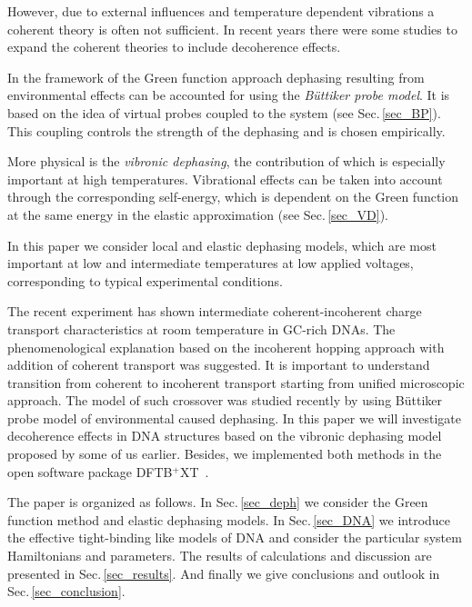 \documentclass[reprint,superscriptaddress,nofootinbib,amsmath,amssymb,prb,floatfix]{revtex4-1}
\begin{document}
However, due to external influences and temperature dependent vibrations a coherent theory is often
not sufficient. In recent years there were some studies to expand the coherent theories to include
decoherence effects.

In the framework of the Green function approach dephasing resulting from environmental effects can
be accounted for using the \textit{B\"uttiker probe model}\cite{buttiker_role_1986,
  Buttiker1988, damato_conductance_1990, Nozaki08jpcc, Nozaki12prb, Chen14jpcl, Venkatramani14faraddis, Beratan15accchemres, Kilgour15jcp}. It is based on the idea of virtual probes coupled to the
system (see Sec.\,\ref{sec_BP}). This coupling controls the strength of the dephasing and is chosen
empirically.

More physical is the \textit{vibronic dephasing}, the contribution of which is especially important
at high temperatures. Vibrational effects can be taken into account through the corresponding
self-energy, which is dependent on the Green function at the same energy in the elastic
approximation\cite{bihary_dephasing_2005, cresti_electronic_2006,
  golizadeh-mojarad_nonequilibrium_2007, penazzi_self_2016} (see Sec.\,\ref{sec_VD}).

In this paper we consider local and elastic dephasing models, which are most important at low and
intermediate temperatures at low applied voltages, corresponding to typical experimental conditions.

The recent experiment\cite{xiang_intermediate_2015} has shown intermediate coherent-incoherent
charge transport characteristics at room temperature in GC-rich DNAs. The phenomenological
explanation based on the incoherent hopping approach with addition of coherent transport was
suggested\cite{xiang_intermediate_2015}. It is important to understand transition from coherent to
incoherent transport starting from unified microscopic approach. The model of such crossover was
studied recently\cite{kim_intermediate_2016} by using B\"uttiker probe model of environmental caused
dephasing. In this paper we will investigate decoherence effects in DNA structures based on the
vibronic dephasing model proposed by some of us earlier\cite{penazzi_self_2016}. Besides, we
implemented both methods in the open software package {\textsc{DFTB$^{\text{+}}$XT\ }}\cite{DFTBXT}.

The paper is organized as follows. In Sec.\,\ref{sec_deph} we consider the Green function method and
elastic dephasing models. In Sec.\,\ref{sec_DNA} we introduce the effective tight-binding like
models of DNA and consider the particular system Hamiltonians and parameters. The results of
calculations and discussion are presented in Sec.\,\ref{sec_results}. And finally we give
conclusions and outlook in Sec.\,\ref{sec_conclusion}.
\end{document}
